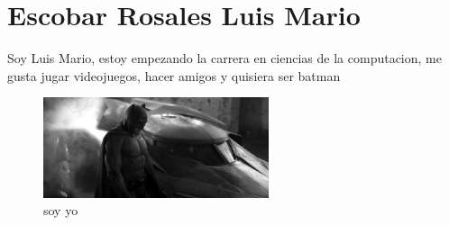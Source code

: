\chapter{Escobar Rosales Luis Mario}
Soy Luis Mario, estoy empezando la carrera en ciencias de la computacion, me gusta jugar videojuegos, hacer amigos y quisiera ser batman
\begin {figure}[H]
  \begin{center}
    \includegraphics[width=250]{./420003818/batman.jpg}
    \caption {soy yo}
  \end{center}
\end{figure}



